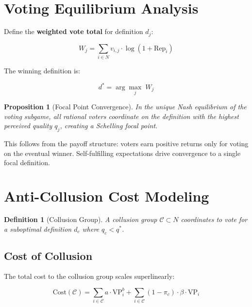 \documentclass[11pt]{article}
\newtheorem{definition}{Definition}
\newtheorem{proposition}{Proposition}
\begin{document}
\section{Voting Equilibrium Analysis}

Define the \textbf{weighted vote total} for definition $d_j$:

\begin{equation}
W_j = \sum_{i \in N} v_{i,j} \cdot \log(1 + \text{Rep}_i)
\end{equation}

The winning definition is:

\begin{equation}
d^* = \arg\max_{j} \; W_j
\end{equation}

\begin{proposition}[Focal Point Convergence]
In the unique Nash equilibrium of the voting subgame, all rational voters coordinate on the definition with the highest perceived quality $q_j$, creating a Schelling focal point.
\end{proposition}

This follows from the payoff structure: voters earn positive returns only for voting on the eventual winner. Self-fulfilling expectations drive convergence to a single focal definition.

\section{Anti-Collusion Cost Modeling}

\begin{definition}[Collusion Group]
A collusion group $\mathcal{C} \subset N$ coordinates to vote for a suboptimal definition $d_c$ where $q_c < q^*$.
\end{definition}

\subsection{Cost of Collusion}

The total cost to the collusion group scales superlinearly:

\begin{equation}
\text{Cost}(\mathcal{C}) = \sum_{i \in \mathcal{C}} a \cdot \text{VP}_i^b + \sum_{i \in \mathcal{C}} (1 - \pi_c) \cdot \beta \cdot \text{VP}_i
\end{equation}
\end{document}
